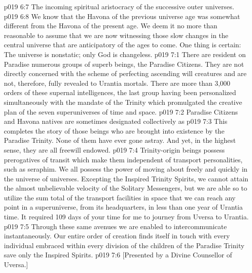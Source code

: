 \vs p019 6:7 \bibnobreakspace The incoming spiritual aristocracy of the successive outer universes.
\vs p019 6:8 We know that the Havona of the previous universe age was somewhat different from the Havona of the present age. We deem it no more than reasonable to assume that we are now witnessing those slow changes in the central universe that are anticipatory of the ages to come. One thing is certain: The universe is nonstatic; only God is changeless.
\vs p019 7:1 There are resident on Paradise numerous groups of superb beings, the Paradise Citizens. They are not directly concerned with the scheme of perfecting ascending will creatures and are not, therefore, fully revealed to Urantia mortals. There are more than 3,000 orders of these supernal intelligences, the last group having been personalized simultaneously with the mandate of the Trinity which promulgated the creative plan of the seven superuniverses of time and space.
\vs p019 7:2 \pc Paradise Citizens and Havona natives are sometimes designated collectively as 
\vs p019 7:3 \pc This completes the story of those beings who are brought into existence by the Paradise Trinity. None of them have ever gone astray. And yet, in the highest sense, they are all freewill endowed.
\vs p019 7:4 Trinity\hyp{}origin beings possess prerogatives of transit which make them independent of transport personalities, such as seraphim. We all possess the power of moving about freely and quickly in the universe of universes. Excepting the Inspired Trinity Spirits, we cannot attain the almost unbelievable velocity of the Solitary Messengers, but we are able so to utilize the sum total of the transport facilities in space that we can reach any point in a superuniverse, from its headquarters, in less than one year of Urantia time. It required 109 days of your time for me to journey from Uversa to Urantia.
\vs p019 7:5 Through these same avenues we are enabled to intercommunicate instantaneously. Our entire order of creation finds itself in touch with every individual embraced within every division of the children of the Paradise Trinity save only the Inspired Spirits.
\vsetoff
\vs p019 7:6 [Presented by a Divine Counsellor of Uversa.]
